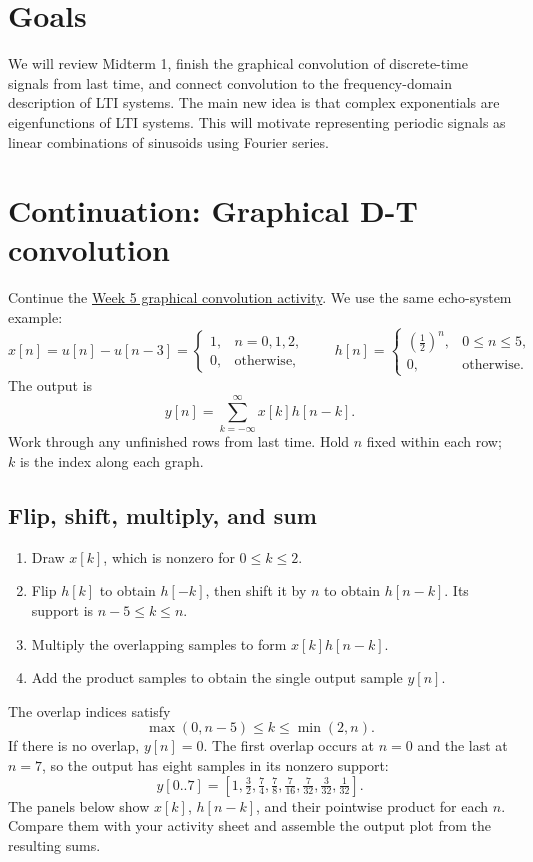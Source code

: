 
\section{Goals}
We will review Midterm 1, finish the graphical convolution of discrete-time
signals from last time, and connect convolution to the frequency-domain
description of LTI systems. The main new idea is that complex exponentials
are eigenfunctions of LTI systems. This will motivate representing periodic
signals as linear combinations of sinusoids using Fourier series.

\section{Continuation: Graphical D-T convolution}
Continue the
\href{../week5_convolution/in-class-activity-graphical-conv.pdf}{Week 5
graphical convolution activity}. We use the same echo-system example:
\[
x[n]=u[n]-u[n-3]=
\begin{cases}
1, & n=0,1,2,\\
0, & \text{otherwise,}
\end{cases}
\qquad
h[n]=
\begin{cases}
\left(\tfrac12\right)^n, & 0\le n\le5,\\
0, & \text{otherwise.}
\end{cases}
\]
The output is
\[
y[n]=\sum_{k=-\infty}^{\infty}x[k]h[n-k].
\]
Work through any unfinished rows from last time. Hold $n$ fixed within
each row; $k$ is the index along each graph.

\subsection{Flip, shift, multiply, and sum}
\begin{enumerate}
  \item Draw $x[k]$, which is nonzero for $0\le k\le2$.
  \item Flip $h[k]$ to obtain $h[-k]$, then shift it by $n$ to obtain
  $h[n-k]$. Its support is $n-5\le k\le n$.
  \item Multiply the overlapping samples to form $x[k]h[n-k]$.
  \item Add the product samples to obtain the single output sample $y[n]$.
\end{enumerate}
The overlap indices satisfy
\[
\max(0,n-5)\le k\le\min(2,n).
\]
If there is no overlap, $y[n]=0$. The first overlap occurs at $n=0$ and
the last at $n=7$, so the output has eight samples in its nonzero support:
\[
y[0..7]=
\left[1,\tfrac32,\tfrac74,\tfrac78,\tfrac7{16},\tfrac7{32},
\tfrac3{32},\tfrac1{32}\right].
\]
The panels below show $x[k]$, $h[n-k]$, and their pointwise product for
each $n$. Compare them with your activity sheet and assemble the output
plot from the resulting sums.

